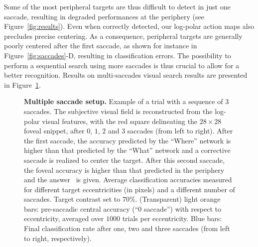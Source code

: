 Some of the most peripheral targets are thus difficult to detect in just one saccade, resulting in degraded performances at the periphery (see Figure~\ref{fig:results}). Even when correctly detected, our log-polar action maps also precludes precise centering. As a consequence, peripheral targets are generally poorly centered after the first saccade, as shown for instance in Figure~\ref{fig:saccades}-D, resulting in classification errors. The possibility to perform a sequential search using more saccades is thus crucial to allow for a better recognition. Results on multi-saccades visual search results are presented in Figure~\ref{fig:results-saccades}.

\begin{figure}[t!]%
	\caption{
		{\bf Multiple saccade setup.} %
		\A Example of a trial with a sequence of $3$ saccades. The subjective visual field is reconstructed from the log-polar visual features, with the red square delineating the $28\times28$ foveal snippet, after $0$, $1$, $2$ and $3$ saccades (from left to right). After the first saccade, the accuracy predicted by the ``Where'' network is higher than that predicted by the ``What'' network and a corrective saccade is realized to center the target. After this second saccade, the foveal accuracy is higher than that predicted in the periphery and the answer \ANS\ is given.
		\B Average classification accuracies measured for different target eccentricities (in pixels) and a different number of saccades. Target contrast set to $70\%$. (Transparent) light orange bars: pre-saccadic central accuracy (``0 saccade'') with respect to eccentricity, averaged over $1000$ trials per eccentricity. Blue bars: Final classification rate after one, two and three saccades (from left to right, respectively).
		\label{fig:results-saccades}}%
\end{figure}%
